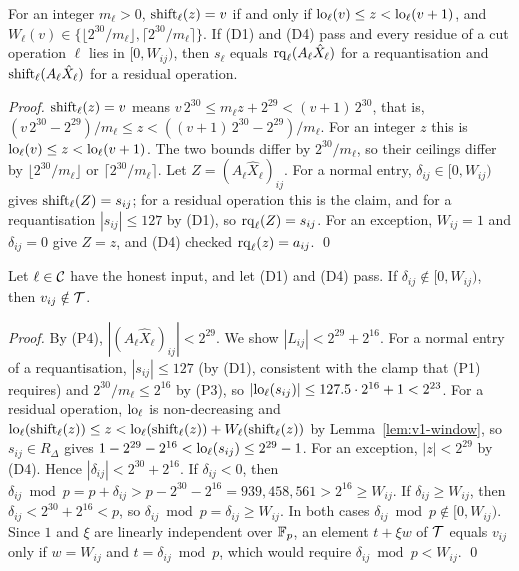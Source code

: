\begin{lemma}[windows]
  \label{lem:v1-window}
  For an integer $m_\ell > 0$, $\mathrm{shift}_\ell(z) = v$ if and only if $\mathrm{lo}_\ell(v) \le z <
  \mathrm{lo}_\ell(v+1)$, and $W_\ell(v) \in \{\lfloor 2^{30}/m_\ell \rfloor, \lceil 2^{30}/m_\ell
  \rceil\}$. If (D1) and (D4) pass and every residue of a cut operation $\ell$ lies in $[0,
  W_{ij})$, then $s_\ell$ equals $\mathrm{rq}_\ell(A_\ell \hat X_\ell)$ for a requantisation and
  $\mathrm{shift}_\ell(A_\ell \hat X_\ell)$ for a residual operation.
\end{lemma}

\noindent\emph{Proof.} $\mathrm{shift}_\ell(z) = v$ means $v\,2^{30} \le m_\ell z + 2^{29} < (v+1)\,
2^{30}$, that is, $(v\,2^{30} - 2^{29})/m_\ell \le z < ((v+1)\,2^{30} - 2^{29})/m_\ell$. For an
integer $z$ this is $\mathrm{lo}_\ell(v) \le z < \mathrm{lo}_\ell(v+1)$. The two bounds differ by
$2^{30}/m_\ell$, so their ceilings differ by $\lfloor 2^{30}/m_\ell \rfloor$ or $\lceil
2^{30}/m_\ell \rceil$. Let $Z = (A_\ell \hat X_\ell)_{ij}$. For a normal entry, $\delta_{ij} \in
[0, W_{ij})$ gives $\mathrm{shift}_\ell(Z) = s_{ij}$; for a residual operation this is the claim, and for
a requantisation $|s_{ij}| \le 127$ by (D1), so $\mathrm{rq}_\ell(Z) = s_{ij}$. For an exception,
$W_{ij} = 1$ and $\delta_{ij} = 0$ give $Z = z$, and (D4) checked $\mathrm{rq}_\ell(z) = a_{ij}$. \qed

\begin{lemma}
  \label{lem:v1-nowrap}
  Let $\ell \in \mathcal{C}$ have the honest input, and let (D1) and (D4) pass. If $\delta_{ij} \notin
  [0, W_{ij})$, then $v_{ij} \notin \mathcal{T}$.
\end{lemma}

\noindent\emph{Proof.} By (P4), $|(A_\ell \hat X_\ell)_{ij}| < 2^{29}$. We show $|L_{ij}| < 2^{29}
+ 2^{16}$. For a normal entry of a requantisation, $|s_{ij}| \le 127$ (by (D1), consistent with the
clamp that (P1) requires) and $2^{30}/m_\ell \le 2^{16}$ by (P3), so $|\mathrm{lo}_\ell(s_{ij})| \le
127.5 \cdot 2^{16} + 1 < 2^{23}$. For a residual operation, $\mathrm{lo}_\ell$ is non-decreasing and
$\mathrm{lo}_\ell(\mathrm{shift}_\ell(z)) \le z < \mathrm{lo}_\ell(\mathrm{shift}_\ell(z)) + W_\ell(\mathrm{shift}_\ell(z))$ by
Lemma~\ref{lem:v1-window}, so $s_{ij} \in R_\Delta$ gives $1 - 2^{29} - 2^{16} <
\mathrm{lo}_\ell(s_{ij}) \le 2^{29} - 1$. For an exception, $|z| < 2^{29}$ by (D4). Hence $|\delta_{ij}|
< 2^{30} + 2^{16}$. If $\delta_{ij} < 0$, then $\delta_{ij} \bmod p = p + \delta_{ij} > p - 2^{30}
- 2^{16} = 939{,}458{,}561 > 2^{16} \ge W_{ij}$. If $\delta_{ij} \ge W_{ij}$, then $\delta_{ij} <
2^{30} + 2^{16} < p$, so $\delta_{ij} \bmod p = \delta_{ij} \ge W_{ij}$. In both cases
$\delta_{ij} \bmod p \notin [0, W_{ij})$. Since $1$ and $\xi$ are linearly independent over $\mathbb{F}_p$, an
element $t + \xi w$ of $\mathcal{T}$ equals $v_{ij}$ only if $w = W_{ij}$ and $t = \delta_{ij} \bmod p$,
which would require $\delta_{ij} \bmod p < W_{ij}$. \qed

